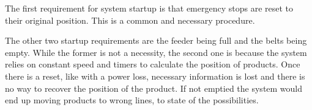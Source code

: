 The first requirement for system startup is that emergency stops are reset to their original position. This is a common and necessary procedure. 

The other two startup requirements are the feeder being full and the belts being empty. While the former is not a necessity, the second one is because the system relies on constant speed and timers to calculate the position of products. Once there is a reset, like with a power loss, necessary information is lost and there is no way to recover the position of the product. If not emptied the system would end up moving products to wrong lines, to state of the possibilities.
